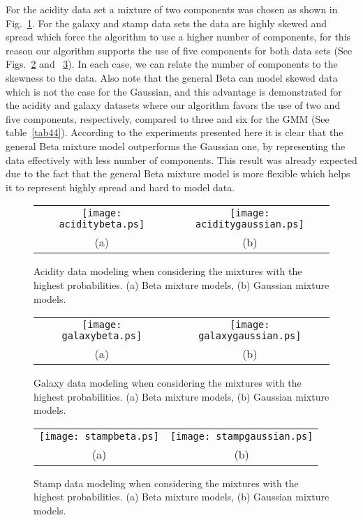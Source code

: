 \documentclass[journal,10pt]{elsart}
\begin{document}
For the acidity data set a mixture of two components was chosen as shown in Fig.~\ref{fig:5}. For the galaxy and stamp data sets the data are highly
skewed and spread which force the algorithm to use a higher number of components,
for this reason our algorithm supports the use of five components for both data sets (See Figs.~\ref{fig:6} and ~\ref{fig:7}).
In each case, we can relate the number of components to the skewness to the data.
Also note that the general Beta can model skewed data which is not the case for the Gaussian,
and this advantage is demonstrated for the acidity and galaxy datasets where our algorithm favors the use of two and five components, respectively,
compared to three and six for the GMM (See table~\ref{tab44}). According to the experiments presented here it is clear that the general Beta mixture model
outperforms the Gaussian one, by representing the data
effectively with less number of components. This result was already expected due to the fact that the general Beta mixture model is more flexible which
helps it to represent highly spread and hard to model data.
\begin{figure}[!h]
\begin{center}
\begin{tabular}{c c}
\texttt{[image: aciditybeta.ps]}&\texttt{[image: aciditygaussian.ps]}\\
(a)&(b)
\end{tabular}
\end{center}
\caption{Acidity data modeling when considering the mixtures with the highest probabilities. (a) Beta mixture models, (b) Gaussian mixture models.}\label{fig:5}
\end{figure}
\begin{figure}[!h]
\begin{center}
\begin{tabular}{c c}
\texttt{[image: galaxybeta.ps]}&\texttt{[image: galaxygaussian.ps]}\\
(a)&(b)
\end{tabular}
\end{center}
\caption{Galaxy data modeling when considering the mixtures with the highest probabilities. (a) Beta mixture models, (b) Gaussian mixture models.}\label{fig:6}
\end{figure}
\begin{figure}[!h]
\begin{center}
\begin{tabular}{c c}
\texttt{[image: stampbeta.ps]}&\texttt{[image: stampgaussian.ps]}\\
(a)&(b)
\end{tabular}
\end{center}
\caption{Stamp data modeling when considering the mixtures with the highest probabilities. (a) Beta mixture models, (b) Gaussian mixture models.}\label{fig:7}
\end{figure}
\end{document}
